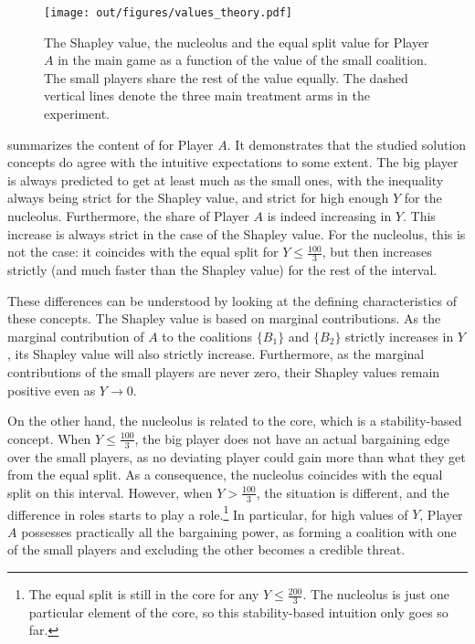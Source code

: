 \documentclass[12pt]{article}
\begin{document}
\begin{figure}
    \centering
    \texttt{[image: out/figures/values\_theory.pdf]}
    \caption{The Shapley value, the nucleolus and the equal split value for Player $A$ in the main game as a function of the value of the small coalition. The small players share the rest of the value equally. The dashed vertical lines denote the three main treatment arms in the experiment.}
    \label{fig:values_theory}
\end{figure}

 summarizes the content of  for Player $A$. It demonstrates that the studied solution concepts do agree with the intuitive expectations to some extent. The big player is always predicted to get at least much as the small ones, with the inequality always being strict for the Shapley value, and strict for high enough $Y$ for the nucleolus. Furthermore, the share of Player $A$ is indeed increasing in $Y$. This increase is always strict in the case of the Shapley value. For the nucleolus, this is not the case: it coincides with the equal split for $Y \leq \frac{100}{3}$, but then increases strictly (and much faster than the Shapley value) for the rest of the interval.

These differences can be understood by looking at the defining characteristics of these concepts. The Shapley value is based on marginal contributions. As the marginal contribution of $A$ to the coalitions $\{B_1\}$ and $\{B_2\}$ strictly increases in $Y$, its Shapley value will also strictly increase. Furthermore, as the marginal contributions of the small players are never zero, their Shapley values remain positive even as $Y \to 0$.

On the other hand, the nucleolus is related to the core, which is a stability-based concept. When $Y \leq \frac{100}{3}$, the big player does not have an actual bargaining edge over the small players, as no deviating player could gain more than what they get from the equal split. As a consequence, the nucleolus coincides with the equal split on this interval. However, when $Y > \frac{100}{3}$, the situation is different, and the difference in roles starts to play a role.\footnote{The equal split is still in the core for any $Y \leq \frac{200}{3}$. The nucleolus is just one particular element of the core, so this stability-based intuition only goes so far.} In particular, for high values of $Y$, Player $A$ possesses practically all the bargaining power, as forming a coalition with one of the small players and excluding the other becomes a credible threat.
\end{document}
